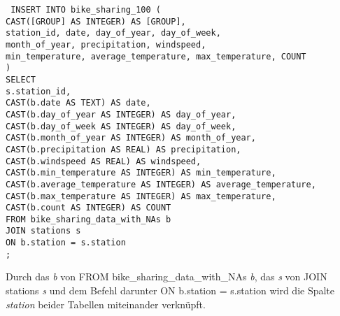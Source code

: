 \documentclass[a4paper, 12pt]{article}
\begin{document}
{{\fontsize{10}{12}\selectfont
\texttt{%
INSERT INTO bike\_sharing\_100 ( \\
    \hspace*{1.5em} CAST([GROUP] AS INTEGER) AS [GROUP], \\
    \hspace*{1.5em} station\_id, date, day\_of\_year, day\_of\_week, \\
    \hspace*{1.5em} month\_of\_year, precipitation, windspeed, \\
    \hspace*{1.5em} min\_temperature, average\_temperature, max\_temperature, COUNT \\
) \\
SELECT \\
    \hspace*{1.5em} s.station\_id, \\
    \hspace*{1.5em} CAST(b.date AS TEXT) AS date, \\
    \hspace*{1.5em} CAST(b.day\_of\_year AS INTEGER) AS day\_of\_year, \\
    \hspace*{1.5em} CAST(b.day\_of\_week AS INTEGER) AS day\_of\_week, \\
    \hspace*{1.5em} CAST(b.month\_of\_year AS INTEGER) AS month\_of\_year, \\
    \hspace*{1.5em} CAST(b.precipitation AS REAL) AS precipitation, \\
    \hspace*{1.5em} CAST(b.windspeed AS REAL) AS windspeed, \\
    \hspace*{1.5em} CAST(b.min\_temperature AS INTEGER) AS min\_temperature, \\
    \hspace*{1.5em} CAST(b.average\_temperature AS INTEGER) AS average\_temperature, \\
    \hspace*{1.5em} CAST(b.max\_temperature AS INTEGER) AS max\_temperature, \\
    \hspace*{1.5em} CAST(b.count AS INTEGER) AS COUNT \\
FROM bike\_sharing\_data\_with\_NAs b \\
JOIN stations s \\
ON b.station = s.station\\
;}}

\vspace{\baselineskip}

Durch das \textit{b} von FROM bike\_sharing\_data\_with\_NAs \textit{b}, das \textit{s} von JOIN stations \textit{s} und dem Befehl darunter ON b.station = s.station wird die Spalte \textit{station} beider Tabellen miteinander verknüpft.}
\end{document}
